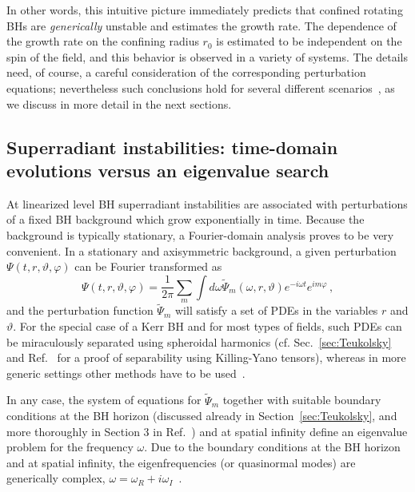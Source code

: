 \documentclass[11pt]{article}
\numberwithin{equation}{section} %
\begin{document}
In other words, this intuitive picture immediately predicts that confined rotating BHs are {\it generically}
unstable and estimates the growth rate. The dependence of the growth rate on the confining radius $r_0$ is estimated to be independent on the spin of the field, and this behavior is observed in a variety of systems. The details need, of course, a careful consideration of the corresponding perturbation equations; nevertheless such conclusions hold for several different 
scenarios~\cite{Cardoso:2004nk,Cardoso:2004hs,Cardoso:2013pza,Cardoso:2005vk,Brito:2014nja}, as we discuss in more detail in the next sections.
\subsection{Superradiant instabilities: time-domain evolutions versus an eigenvalue search}
At linearized level BH superradiant instabilities are associated with perturbations of a fixed BH background which grow exponentially in time. Because the background is typically stationary, a Fourier-domain analysis proves to be very convenient. In a stationary and axisymmetric background, a given perturbation $\Psi(t,r,\vartheta,\varphi)$ can be Fourier transformed as 
%
\begin{equation}
 \Psi(t,r,\vartheta,\varphi)=\frac{1}{2\pi}\sum_m\int d\omega \tilde\Psi_m(\omega,r,\vartheta) e^{-i\omega t} e^{im\varphi}\,, \label{Fourier}
\end{equation}
and the perturbation function $\tilde\Psi_m$ will satisfy a set of PDEs in the variables $r$ and $\vartheta$. For the special case of a Kerr BH and for most types of fields, such PDEs can be miraculously separated using spheroidal harmonics (cf. Sec.~\ref{sec:Teukolsky} and Ref.~\cite{Kalnins-separability} for a proof of separability using Killing-Yano tensors), whereas in more generic settings other methods have to be used~\cite{Pani:2013pma}.

In any case, the system of equations for $\tilde\Psi_m$ together with suitable boundary conditions at the BH horizon (discussed already in Section~\ref{sec:Teukolsky}, and more thoroughly in Section 3 in Ref.~\cite{Berti:2009kk}) and at spatial infinity define an eigenvalue problem for the frequency $\omega$. Due to the boundary conditions at the BH horizon and at spatial infinity,
the eigenfrequencies (or quasinormal modes) are generically complex, $\omega=\omega_R+i\omega_I$~\cite{Berti:2009kk}.
\end{document}
